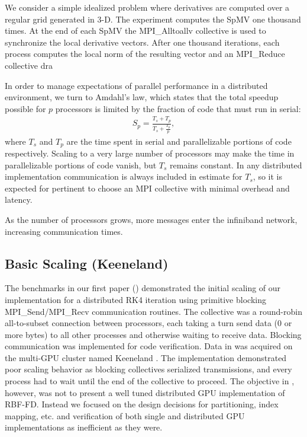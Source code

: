\documentclass{report}
\begin{document}
We consider a simple idealized problem where derivatives are computed over a regular grid generated in 3-D. The experiment computes the SpMV one thousand times. At the end of each SpMV the MPI\_Alltoallv collective is used to synchronize the local derivative vectors. After one thousand iterations, each process computes the local norm of the resulting vector and an MPI\_Reduce collective dra




In order to manage expectations of parallel performance in a distributed environment, we turn to Amdahl's law, which states that the total speedup possible for $p$ processors is limited by the fraction of code that must run in serial:
\begin{align}
S_p = \frac{T_s + T_p}{T_s + \frac{T_p}{p}},  \nonumber
\end{align}
where $T_s$ and $T_p$ are the time spent in serial and parallelizable portions of code respectively. Scaling to a very large number of processors may make the time in parallelizable portions of code vanish, but $T_s$ remains constant. In any distributed implementation communication is always included in estimate for $T_s$, so it is expected for  pertinent to choose an MPI collective with minimal overhead and latency. 

As the number of processors grows, more messages enter the infiniband network, increasing communication times. 



\subsection{Basic Scaling (Keeneland)}



The benchmarks in our first paper (\cite{BolligFlyerErlebacher2012}) demonstrated the initial scaling of our implementation for a distributed RK4 iteration using primitive blocking MPI\_Send/MPI\_Recv communication routines. The collective was a round-robin all-to-subset connection between processors, each taking a turn send data (0 or more bytes) to all other processes and otherwise waiting to receive data. Blocking communication was implemented for code verification. Data in \cite{BolligFlyerErlebacher2012} was acquired on the multi-GPU cluster named Keeneland \cite{Vetter2011}. The implementation demonstrated poor scaling behavior as blocking collectives serialized transmissions, and every process had to wait until the end of the collective to proceed. The objective in \cite{BolligFlyerErlebacher2012}, however, was not to present a well tuned distributed GPU implementation of RBF-FD. Instead we focused on the design decisions for partitioning, index mapping, etc. and verification of both single and distributed GPU implementations as inefficient as they were. 
\end{document}
